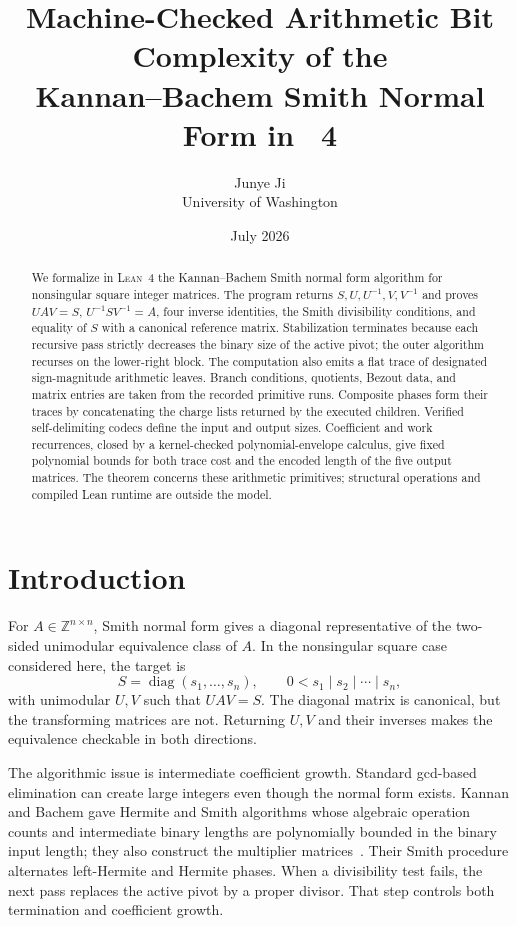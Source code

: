 \documentclass[11pt]{article}
\title{Machine-Checked Arithmetic Bit Complexity of the\\
Kannan--Bachem Smith Normal Form in \Lean~4}
\author{Junye Ji\\University of Washington}
\date{July 2026}
\theoremstyle{definition}
\newcommand{\Z}{\mathbb{Z}}
\newcommand{\Lean}{\textsc{Lean}}
\begin{document}
\maketitle

\begin{abstract}
We formalize in \Lean~4 the Kannan--Bachem Smith normal form algorithm for nonsingular square integer matrices.  The program returns $S,U,U^{-1},V,V^{-1}$ and proves $UAV=S$, $U^{-1}SV^{-1}=A$, four inverse identities, the Smith divisibility conditions, and equality of $S$ with a canonical reference matrix.  Stabilization terminates because each recursive pass strictly decreases the binary size of the active pivot; the outer algorithm recurses on the lower-right block.  The computation also emits a flat trace of designated sign-magnitude arithmetic leaves.  Branch conditions, quotients, Bezout data, and matrix entries are taken from the recorded primitive runs.  Composite phases form their traces by concatenating the charge lists returned by the executed children.  Verified self-delimiting codecs define the input and output sizes.  Coefficient and work recurrences, closed by a kernel-checked polynomial-envelope calculus, give fixed polynomial bounds for both trace cost and the encoded length of the five output matrices.  The theorem concerns these arithmetic primitives; structural operations and compiled Lean runtime are outside the model.
\end{abstract}

\section{Introduction}

For $A\in\Z^{n\times n}$, Smith normal form gives a diagonal representative of the two-sided unimodular equivalence class of $A$.  In the nonsingular square case considered here, the target is
\[
  S=\operatorname{diag}(s_1,\ldots,s_n),
  \qquad 0<s_1\mid s_2\mid\cdots\mid s_n,
\]
with unimodular $U,V$ such that $UAV=S$.  The diagonal matrix is canonical, but the transforming matrices are not.  Returning $U,V$ and their inverses makes the equivalence checkable in both directions.

The algorithmic issue is intermediate coefficient growth.  Standard gcd-based elimination can create large integers even though the normal form exists.  Kannan and Bachem gave Hermite and Smith algorithms whose algebraic operation counts and intermediate binary lengths are polynomially bounded in the binary input length; they also construct the multiplier matrices~\cite{kannan1979}.  Their Smith procedure alternates left-Hermite and Hermite phases.  When a divisibility test fails, the next pass replaces the active pivot by a proper divisor.  That step controls both termination and coefficient growth.
\end{document}
